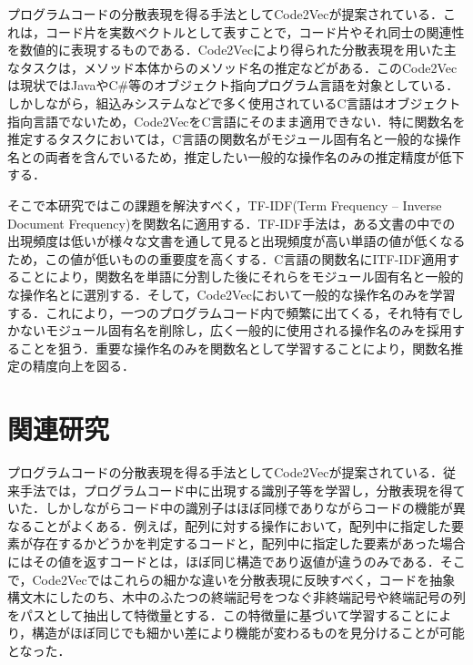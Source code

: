 \documentclass[submit,techrep,noauthor]{ipsj}
\begin{document}
プログラムコードの分散表現を得る手法としてCode2Vec\cite{alon2019code2vec}が提案されている．これは，コード片を実数ベクトルとして表すことで，コード片やそれ同士の関連性を数値的に表現するものである．Code2Vecにより得られた分散表現を用いた主なタスクは，メソッド本体からのメソッド名の推定などがある．このCode2Vecは現状ではJavaやC\#等のオブジェクト指向プログラム言語を対象としている．しかしながら，組込みシステムなどで多く使用されているC言語はオブジェクト指向言語でないため，Code2VecをC言語にそのまま適用できない．特に関数名を推定するタスクにおいては，C言語の関数名がモジュール固有名と一般的な操作名との両者を含んでいるため，推定したい一般的な操作名のみの推定精度が低下する．

そこで本研究ではこの課題を解決すべく，TF-IDF(Term Frequency – Inverse Document Frequency)\cite{ramos2003using}を関数名に適用する．TF-IDF手法は，ある文書の中での出現頻度は低いが様々な文書を通して見ると出現頻度が高い単語の値が低くなるため，この値が低いものの重要度を高くする．C言語の関数名にITF-IDF適用することにより，関数名を単語に分割した後にそれらをモジュール固有名と一般的な操作名とに選別する．そして，Code2Vecにおいて一般的な操作名のみを学習する．これにより，一つのプログラムコード内で頻繁に出てくる，それ特有でしかないモジュール固有名を削除し，広く一般的に使用される操作名のみを採用することを狙う．重要な操作名のみを関数名として学習することにより，関数名推定の精度向上を図る．




\section{関連研究}

プログラムコードの分散表現を得る手法としてCode2Vec\cite{alon2019code2vec}が提案されている．従来手法では，プログラムコード中に出現する識別子等を学習し，分散表現を得ていた．しかしながらコード中の識別子はほぼ同様でありながらコードの機能が異なることがよくある．例えば，配列に対する操作において，配列中に指定した要素が存在するかどうかを判定するコードと，配列中に指定した要素があった場合にはその値を返すコードとは，ほぼ同じ構造であり返値が違うのみである．そこで，Code2Vecではこれらの細かな違いを分散表現に反映すべく，コードを抽象構文木にしたのち、木中のふたつの終端記号をつなぐ非終端記号や終端記号の列をパスとして抽出して特徴量とする．この特徴量に基づいて学習することにより，構造がほぼ同じでも細かい差により機能が変わるものを見分けることが可能となった．
\end{document}
